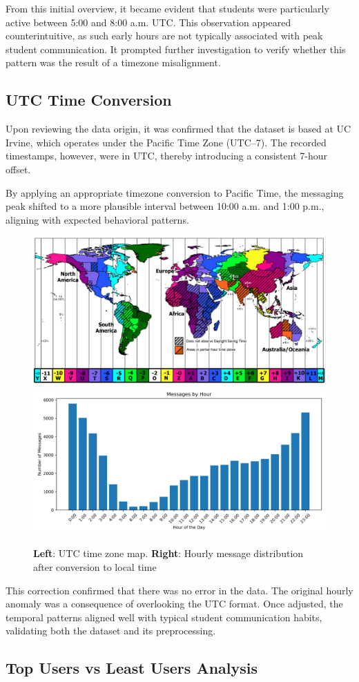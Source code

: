 From this initial overview, it became evident that students were particularly active between 5:00 and 8:00 a.m. UTC. This observation appeared counterintuitive, as such early hours are not typically associated with peak student communication. It prompted further investigation to verify whether this pattern was the result of a timezone misalignment.

\subsection{UTC Time Conversion}

Upon reviewing the data origin, it was confirmed that the dataset is based at UC Irvine, which operates under the Pacific Time Zone (UTC--7). The recorded timestamps, however, were in UTC, thereby introducing a consistent 7-hour offset.

By applying an appropriate timezone conversion to Pacific Time, the messaging peak shifted to a more plausible interval between 10:00 a.m. and 1:00 p.m., aligning with expected behavioral patterns.

\begin{figure}[H]
    \centering
    \includegraphics[width=0.3\linewidth]{../Images/UTCmap.png}
    \hspace{10pt}
    \includegraphics[width=0.35\linewidth]{../Images/messages_by_hour.png}
    \caption{\textbf{Left}: UTC time zone map. \textbf{Right}: Hourly message distribution after conversion to local time}
    \label{fig:hourly-after-conversion}
\end{figure}


This correction confirmed that there was no error in the data. The original hourly anomaly was a consequence of overlooking the UTC format. Once adjusted, the temporal patterns aligned well with typical student communication habits, validating both the dataset and its preprocessing.

\subsection{Top Users vs Least Users Analysis}


